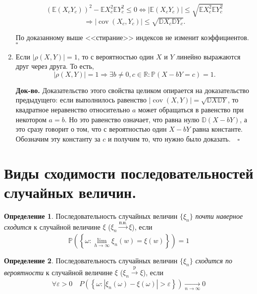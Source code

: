 \documentclass[oneside,final,14pt]{extreport}
\newcommand\myqed{{\bf Док-во.}}
\theoremstyle{definition}
\newtheorem{defn}{Определение}[section]
\begin{document}
\begin{enumerate}
    $$\left(\mathbb{E}\left(X_{c} Y_{c}\right)\right)^{2}-\mathbb{E} X_{c}^{2} \mathbb{E} Y_{c}^{2} \leqslant 0 \Longleftrightarrow\left|\mathbb{E}\left(X_{c} Y_{c}\right)\right| \leqslant \sqrt{\mathbb{E} X_{c}^{2} \mathbb{E} Y_{c}^{2}} $$$$\Rightarrow\left|\operatorname{cov}\left(X_{c}, Y_{c}\right)\right| \leqslant \sqrt{\mathbb{D} X_{c} \mathbb{D} Y_{c}}.$$
    
    По доказанному выше <<стирание>> индексов не изменит коэффициентов. $\square$

    \item Если $|\rho(X,Y)| = 1$, то с вероятностью один $X$ и $Y$ линейно выражаются друг через друга. То есть,
    $$|\rho(X, Y)|=1 \Longrightarrow \exists b \neq 0, c \in \mathbb{R}: \mathbb{P}(X-b Y=c)=1.$$
    
    \myqed{} Доказательство этого свойства целиком опирается на доказательство предыдущего: если выполнилось равенство $|\operatorname{cov}(X, Y)|=\sqrt{\mathbb{D} X \mathbb{D} Y}$, то квадратное неравенство относительно $a$ может обращаться в равенство при некотором $a = b$. Но это равенство означает, что равна нулю $\mathbb{D}(X-b Y)$, а это сразу говорит о том, что с вероятностью один $X - bY$ равна константе. Обозначим эту константу за $c$ и получим то, что нужно было доказать. $~~~\square$

\end{enumerate}

\section{Виды сходимости последовательностей случайных величин.}
\begin{defn}
    Последовательность случайных величин $\{\xi_n\}$ {\it почти наверное сходится} к случайной величине $\xi$ ($\xi_n \xrightarrow[]{\text{п.н.}} \xi$), если
    \begin{equation*}
        \mathbb{P}\left(\left\{\omega: \lim\limits _{h \rightarrow \infty} \xi_{n}(w)=\xi(w)\right\}\right)=1
    \end{equation*}
\end{defn}

\begin{defn}
    Последовательность случайных величин $\{\xi_n\}$ {\it сходится по вероятности} к случайной величине $\xi$ ($\xi_n \xrightarrow[]{\text{p}} \xi$), если
    \begin{equation*}
        \forall \varepsilon>0 \quad P\left(\left\{\omega: |\xi_{n}(\omega)-\xi(\omega)|>\varepsilon\right\}\right) \xrightarrow[n \to \infty]{} 0
    \end{equation*}
\end{defn}
\end{document}
